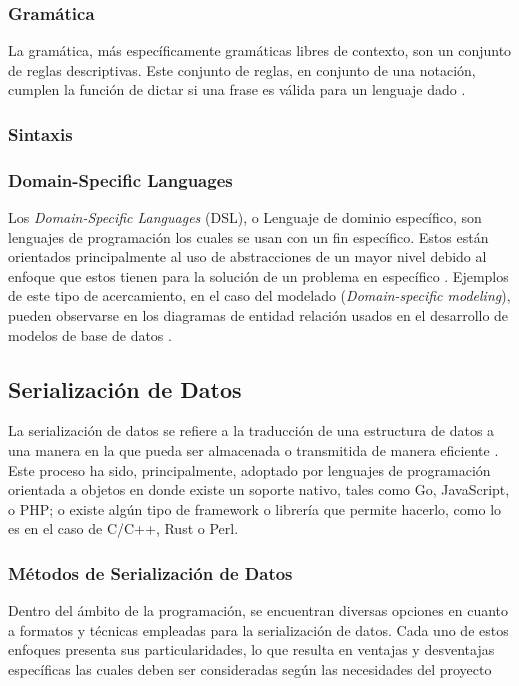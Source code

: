 \subsubsection{Gramática}


La gramática, más específicamente gramáticas libres de contexto, son un conjunto de reglas descriptivas. Este conjunto de reglas, en conjunto de una notación, cumplen la función de dictar si una frase es válida para un lenguaje dado \cite[p. 101]{Sipser2012-wl}. 

\subsubsection{Sintaxis}


\subsubsection{Domain-Specific Languages} %

Los \textit{Domain-Specific Languages} (DSL), o Lenguaje de dominio específico, son lenguajes de programación los cuales se usan con un fin específico. Estos están orientados principalmente al uso de abstracciones de un mayor nivel debido al enfoque que estos tienen para la solución de un problema en específico \cite{Kelly2008}. Ejemplos de este tipo de acercamiento, en el caso del modelado (\textit{Domain-specific modeling}), pueden observarse en los diagramas de entidad relación usados en el desarrollo de modelos de base de datos \cite{Celikovic2014ADF}. 

\subsection{Serialización de Datos}

La serialización de datos se refiere a la traducción de una estructura de datos a una manera en la que pueda ser almacenada o transmitida de manera eficiente \cite{mozillaSerialization}. Este proceso ha sido, principalmente, adoptado por lenguajes de programación orientada a objetos en donde existe un soporte nativo, tales como Go, JavaScript, o PHP; o existe algún tipo de framework o librería que permite hacerlo, como lo es en el caso de C/C++, Rust o Perl.

\subsubsection{Métodos de Serialización de Datos}

Dentro del ámbito de la programación, se encuentran diversas opciones en cuanto a formatos y técnicas empleadas para la serialización de datos. Cada uno de estos enfoques presenta sus particularidades, lo que resulta en ventajas y desventajas específicas las cuales deben ser consideradas según las necesidades del proyecto  

